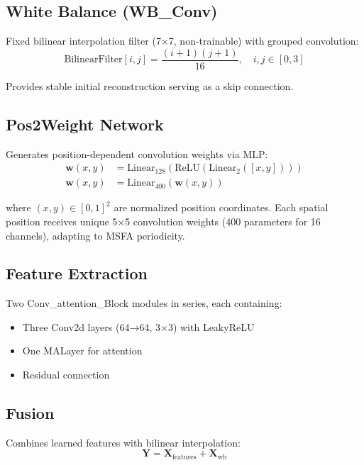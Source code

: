 \documentclass[conference]{IEEEtran}
\begin{document}
\subsection{White Balance (WB\_Conv)}

Fixed bilinear interpolation filter (7×7, non-trainable) with grouped convolution:
\begin{equation}
\text{BilinearFilter}[i,j] = \frac{(i+1)(j+1)}{16}, \quad i,j \in [0,3]
\end{equation}

Provides stable initial reconstruction serving as a skip connection.

\subsection{Pos2Weight Network}

Generates position-dependent convolution weights via MLP:
\begin{equation}
\begin{aligned}
\mathbf{w}(x,y) &= \text{Linear}_{128}(\text{ReLU}(\text{Linear}_2([x,y]))) \\
\mathbf{w}(x,y) &= \text{Linear}_{400}(\mathbf{w}(x,y))
\end{aligned}
\end{equation}

where $(x,y) \in [0,1]^2$ are normalized position coordinates. Each spatial position receives unique 5×5 convolution weights (400 parameters for 16 channels), adapting to MSFA periodicity.

\subsection{Feature Extraction}

Two Conv\_attention\_Block modules in series, each containing:
\begin{itemize}
    \item Three Conv2d layers (64→64, 3×3) with LeakyReLU
    \item One MALayer for attention
    \item Residual connection
\end{itemize}

\subsection{Fusion}

Combines learned features with bilinear interpolation:
\begin{equation}
\mathbf{Y} = \mathbf{X}_{\text{features}} + \mathbf{X}_{\text{wb}}
\end{equation}
\end{document}
